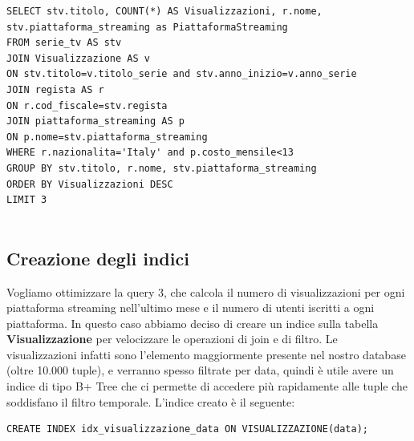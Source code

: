 \documentclass[10pt,a4paper]{article}
\begin{document}
\vspace{0.5cm}
\begin{lstlisting}[caption={Query 5}, label={lst:sql-example}]
SELECT stv.titolo, COUNT(*) AS Visualizzazioni, r.nome, stv.piattaforma_streaming as PiattaformaStreaming
FROM serie_tv AS stv
JOIN Visualizzazione AS v
ON stv.titolo=v.titolo_serie and stv.anno_inizio=v.anno_serie
JOIN regista AS r
ON r.cod_fiscale=stv.regista
JOIN piattaforma_streaming AS p
ON p.nome=stv.piattaforma_streaming
WHERE r.nazionalita='Italy' and p.costo_mensile<13
GROUP BY stv.titolo, r.nome, stv.piattaforma_streaming
ORDER BY Visualizzazioni DESC
LIMIT 3


\end{lstlisting}

\subsection{Creazione degli indici}
Vogliamo ottimizzare la query 3, che calcola il numero di visualizzazioni per ogni piattaforma streaming nell'ultimo mese e il numero di utenti iscritti a ogni piattaforma.\newline
In questo caso abbiamo deciso di creare un indice sulla tabella \textbf{Visualizzazione} per velocizzare le operazioni di join e di filtro. Le visualizzazioni infatti sono l'elemento maggiormente presente nel nostro database (oltre 10.000 tuple), e verranno spesso filtrate per data, quindi è utile avere un indice di tipo B+ Tree che ci permette di accedere più rapidamente alle tuple che soddisfano il filtro temporale. L'indice creato è il seguente:\newline
\begin{lstlisting}[caption={Creazione indice}, label={lst:sql-example}]
CREATE INDEX idx_visualizzazione_data ON VISUALIZZAZIONE(data);
\end{lstlisting}
\end{document}
